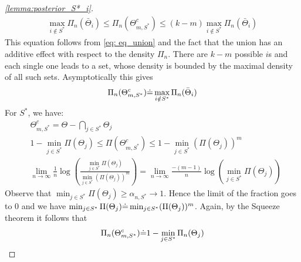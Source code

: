 \begin{proof}[\ref{lemma:posterior_S*_i}]
  \begin{align}
    \max_{i \notin S^*} \Pi_n(\bar{\Theta}_i) \leq \Pi_n(\Theta_{m, S^*}^c) \leq (k-m) \max_{i \notin S^*} \Pi_n(\bar{\Theta}_i)
  \end{align}
  This equation follows from \eqref{eq: eq_union} and the fact that the union has an additive effect with respect to the density $\Pi_n$. There are $k-m$ possible $i$s and each single one leads to a set, whose density is bounded by the maximal density of all such sets.
  Asymptotically this gives
  \begin{align}
    \Pi_n(\Theta_{m, S^*}^c) \dot{=} \max_{i \notin S^*} \Pi_n(\bar{\Theta}_i)
  \end{align}
  For $S^*$, we have:
  \begin{align}
    &\Theta_{m, S^*}^c = \Theta - \bigcap_{j \in S^*} \Theta_j \\
    &1 - \min_{j \in S^*} \Pi(\Theta_j) \leq \Pi(\Theta_{m, S^*}^c) \leq 1 - \min_{j \in S^*} (\Pi(\Theta_j))^m \\
    &\lim_{n \rightarrow \infty} \frac{1}{n} \log(\frac{\min_{j \in S^*} \Pi(\Theta_j)}{\min_{j \in S^*} (\Pi(\Theta_j))^m}) = \lim_{n \rightarrow \infty} \frac{-(m - 1)}{n} \log(\min_{j \in S^*} \Pi(\Theta_j))
  \end{align}
  Observe that $\min_{j \in S^*} \Pi(\Theta_j) \geq \alpha_{n, S^*} \rightarrow 1$. Hence the limit of the fraction goes to 0 and we have $\min_{j \in S^*} \Pi(\Theta_j) \dot{=} \min_{j \in S^*} (\Pi(\Theta_j))^m$. Again, by the Squeeze theorem it follows that
  \begin{align}
    \Pi_n(\Theta_{m, S^*}^c) \dot{=} 1 - \min_{j \in S^*} \Pi_n(\Theta_j)
  \end{align}
\end{proof}

